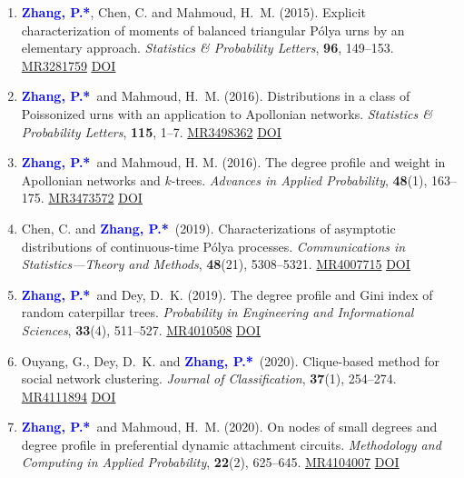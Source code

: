 \documentclass[12pt]{article}
\def\MR#1{\href{http://www.ams.org/mathscinet-getitem?mr=#1}{MR#1}}
\newcommand{\PZ}{\textbf{\textcolor{blue}{Zhang, P.*}}}
\begin{document}
	\begin{enumerate}
		\item \PZ, {\sc Chen, C.} and {\sc Mahmoud, H.\ M.} 
		(2015). Explicit characterization of moments of balanced 
		triangular P\'{o}lya urns by an elementary approach. 
		\emph{Statistics \& Probability Letters}, {\bf 96}, 149--153. \MR{3281759} \href{https://doi.org/10.1016/j.spl.2014.09.016}
		{\underline{DOI}}
		
		\item \PZ\ and {\sc Mahmoud, H.\ M.} (2016). 
		Distributions in a class of Poissonized urns with an application to Apollonian networks. \emph{Statistics \& Probability Letters}, {\bf 115}, 1--7. \MR{3498362}
		\href{https://doi.org/10.1016/j.spl.2016.03.023}
		{\underline{DOI}}
		
		\item \PZ\ and {\sc Mahmoud, H. M.} (2016). The 
		degree profile and weight in Apollonian networks and $k$-trees. {\em Advances in Applied Probability}, \textbf{48}(1), 163--175. \MR{3473572}
		\href{https://doi.org/10.1017/apr.2015.11}
		{\underline{DOI}}
		
		\item {\sc Chen, C.} and \PZ\ (2019). Characterizations of 
		asymptotic distributions of continuous-time P\'{o}lya processes. {\em Communications in Statistics---Theory and Methods}, \textbf{48}(21), 5308--5321. \MR{4007715}
		\href{https://doi.org/10.1080/03610926.2018.1510005}
		{\underline{DOI}}
		
		\item \PZ\ and {\sc Dey, D.\ K.} (2019). The degree 
		profile and Gini index of random caterpillar trees. {\em 
		Probability in Engineering and Informational Sciences}, 
		\textbf{33}(4), 511--527. \MR{4010508}
		\href{https://doi.org/10.1017/S0269964818000475}
		{\underline{DOI}}
		
		\item {\sc Ouyang, G., Dey, D.\ K.} and \PZ\ (2020). 
		Clique-based method for social network clustering. {\em Journal of Classification}, \textbf{37}(1), 254--274. \MR{4111894} \href{https://doi.org/10.1007/s00357-019-9310-5}
		{\underline{DOI}}
		
		\item \PZ\ and {\sc Mahmoud, H.\ M.} (2020). On 
		nodes of small degrees and degree profile in preferential 
		dynamic attachment circuits. {\em Methodology and Computing in Applied Probability}, \textbf{22}(2), 625--645. \MR{4104007}
		\href{https://doi.org/10.1007/s11009-019-09726-4}
		{\underline{DOI}}
		

\end{enumerate}
\end{document}
